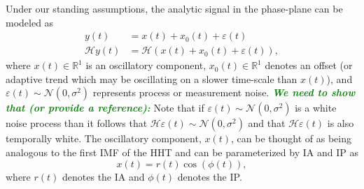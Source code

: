 \documentclass[a4paper]{IEEEtran}
\newcommand{\dean}[1]{\textsf{\emph{\textbf{\textcolor{green}{#1}}}}}
\begin{document}
Under our standing assumptions, the analytic signal in the phase-plane can be modeled as
\begin{align}\label{eq:SignalModel}
y\left( t \right) &= x\left( t \right) + x_0\left( t \right) + \varepsilon \left( t \right) \\
\mathcal{H}y\left( t \right) &= \mathcal{H}(x\left( t \right) + x_0\left( t \right) + \varepsilon \left( t \right)),
\end{align}
where $x(t) \in \mathbb{R}^1$ is an oscillatory component, $x_0(t) \in \mathbb{R}^1$ denotes an offset (or adaptive trend which may be oscillating on a slower time-scale than $x(t)$), and $\varepsilon(t) \sim \mathcal{N}(0,\sigma^2)$ represents process or measurement noise. \dean{We need to show that (or provide a reference):} Note that if $\varepsilon(t) \sim \mathcal{N}(0,\sigma^2)$ is a white noise process than it follows that $\mathcal{H}\varepsilon(t) \sim \mathcal{N}(0,\sigma^2)$ and that $\mathcal{H}\varepsilon(t)$ is also temporally white. 
The oscillatory component, $x(t)$, can be thought of as being analogous to the first IMF of the HHT and can be parameterized by IA and IP as
\begin{equation}\label{eq:InstAmplitudeAndPhase}
    x\left( t \right) = r\left( t \right)\cos \left( {\phi \left( t \right)} \right),
\end{equation}
where $r(t)$ denotes the IA and $\phi(t)$ denotes the IP. 
\end{document}
